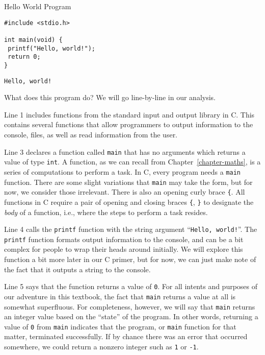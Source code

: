 \begin{cloast}[main.c]{Hello World Program}
\begin{lstlisting}[language=MyC]
#include <stdio.h>

int main(void) {
 printf("Hello, world!");
 return 0;
}
\end{lstlisting}
\tcblower
\begin{lstlisting}[language=MyOutput]
Hello, world!
\end{lstlisting}
\end{cloast}

What does this program do? We will go line-by-line in our analysis.

Line 1 includes functions from the standard input and output library in C. This contains several functions that allow programmers to output information to the console, files, as well as read information from the user.

Line 3 declares a function called \texttt{main} that has no arguments which returns a value of type \texttt{int}. A function, as we can recall from Chapter~\ref{chapter-maths}, is a series of computations to perform a task. In C, every program needs a \texttt{main} function. There are some slight variations that \texttt{main} may take the form, but for now, we consider those irrelevant. There is also an opening curly brace \texttt{\{}. All functions in C require a pair of opening and closing braces \texttt{\{}, \texttt{\}} to designate the \textit{body} of a function, i.e., where the steps to perform a task resides. 

Line 4 calls the \texttt{printf} function with the string argument ``\texttt{Hello, world!}''. The \texttt{printf} function formats output information to the console, and can be a bit complex for people to wrap their heads around initially. We will explore this function a bit more later in our C primer, but for now, we can just make note of the fact that it outputs a string to the console.

Line 5 says that the  function returns a value of \texttt{0}. For all intents and purposes of our adventure in this textbook, the fact that \texttt{main} returns a value at all is somewhat superfluous. For completeness, however, we will say that \texttt{main} returns an integer value based on the ``state'' of the program. In other words, returning a value of \texttt{0} from \texttt{main} indicates that the program, or \texttt{main} function for that matter, terminated successfully. If by chance there was an error that occurred somewhere, we could return a nonzero integer such as \texttt{1} or \texttt{-1}.

